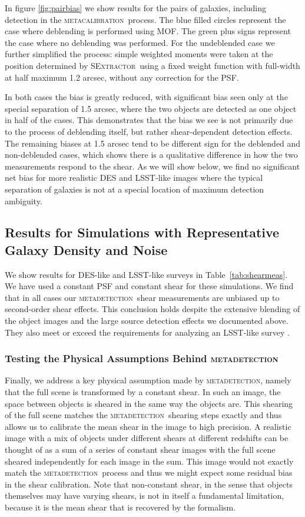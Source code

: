 \documentclass[fleqn,useAMS,usenatbib]{mnras}
\newcommand{\mcal}{\textsc{metacalibration}}
\newcommand{\mdet}{\textsc{metadetection}}
\newcommand{\sx}{\textsc{SExtractor}}
\begin{document}
In figure \ref{fig:pairbias} we show results for the pairs of galaxies, including
detection in the \mcal\ process. The blue filled circles represent the case
where deblending is performed using MOF. The green plus signs represent the
case where no deblending was performed. For the undeblended case we further
simplified the process: simple weighted moments were taken at the position
determined by \sx\ using a fixed weight function with full-width at half
maximum 1.2 arcsec, without any correction for the PSF.

In both cases the bias is greatly reduced, with significant bias seen only at
the special separation of 1.5 arcsec, where the two objects are detected as one
object in half of the cases. This demonstrates that the bias we see is not
primarily due to the process of deblending itself, but rather shear-dependent
detection effects. The remaining biases at 1.5 arcsec tend to be different sign
for the deblended and non-deblended cases, which shows there is a qualitative
difference in how the two measurements respond to the shear. As we will show
below, we find no significant net bias for more realistic DES and LSST-like
images where the typical separation of galaxies is not at a special location of
maximum detection ambiguity.

\subsection{Results for Simulations with Representative Galaxy Density and Noise}
\label{sec:res:constpsf}

We show results for DES-like and LSST-like surveys in Table~\ref{tab:shearmeas}.
We have used a constant PSF and constant shear for these simulations. We find
that in all cases our \mdet\ shear measurements are unbiased up to
second-order shear effects. This conclusion holds despite the extensive blending
of the object images and the large source detection effects we documented
above. They also meet or exceed the requirements for analyzing an LSST-like survey
\citep[e.g.,][]{huterer2006}.

\subsubsection{Testing the Physical Assumptions Behind \mdet}

Finally, we address a key physical assumption made by \mdet, namely that the
full scene is transformed by a constant shear. In such an image, the space
between objects is sheared in the same way the objects are. This shearing of
the full scene matches the \mdet\ shearing steps exactly and thus allows us to
calibrate the mean shear in the image to high precision. A realistic image with
a mix of objects under different shears at different redshifts can be thought
of as a sum of a series of constant shear images with the full scene sheared
independently for each image in the sum.  This image would not exactly match
the \mdet\ process and thus we might expect some residual bias in the shear
calibration.  Note that non-constant shear, in the sense that objects
themselves may have varying shears, is not in itself a fundamental limitation,
because it is the mean shear that is recovered by the formalism.
\end{document}
